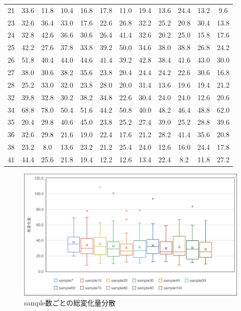 \documentclass{ltjsreport}
\begin{document}
\begin{table}[H]
\begin{center}
\begin{tabular}{c|ccccccccccc}
			21 & 33.6 & 11.8 & 10.4 & 16.8 & 17.8 & 11.0 & 19.4 & 13.6 & 24.4 & 13.2 & 9.6 \\
			23 & 32.6 & 36.4 & 33.0 & 17.6 & 22.6 & 26.8 & 32.2 & 25.2 & 20.8 & 30.4 & 13.8 \\
			24 & 32.8 & 42.6 & 36.6 & 30.6 & 26.4 & 41.4 & 32.6 & 20.2 & 25.0 & 15.8 & 17.6 \\
			25 & 42.2 & 27.6 & 37.8 & 33.8 & 39.2 & 50.0 & 34.6 & 38.0 & 38.8 & 26.8 & 24.2 \\
			26 & 51.8 & 40.4 & 44.0 & 44.6 & 41.4 & 39.2 & 42.8 & 38.4 & 41.6 & 43.0 & 30.0 \\
			27 & 38.0 & 30.6 & 38.2 & 35.6 & 23.8 & 20.4 & 24.4 & 24.2 & 22.6 & 30.6 & 16.8 \\
			28 & 25.2 & 33.0 & 32.0 & 23.8 & 28.0 & 20.0 & 31.4 & 13.6 & 19.6 & 19.4 & 21.2 \\
			32 & 39.8 & 32.8 & 30.2 & 38.2 & 34.8 & 22.6 & 30.4 & 24.0 & 24.0 & 12.6 & 20.6 \\
			34 & 68.8 & 78.0 & 50.4 & 51.6 & 44.2 & 50.8 & 40.0 & 48.2 & 46.4 & 48.8 & 62.0 \\
			35 & 20.4 & 29.8 & 40.6 & 45.0 & 23.8 & 25.2 & 27.4 & 39.0 & 25.2 & 28.8 & 39.6 \\
			36 & 32.6 & 29.8 & 21.6 & 19.0 & 22.4 & 17.6 & 21.2 & 28.2 & 41.4 & 35.6 & 20.8 \\
			38 & 23.2 & 8.0 & 13.6 & 23.2 & 21.2 & 25.4 & 24.0 & 12.6 & 16.0 & 24.4 & 17.8 \\
			41 & 44.4 & 25.6 & 21.8 & 19.4 & 12.2 & 12.6 & 13.4 & 22.4 & 8.2 & 11.8 & 27.2 \\
			\bottomrule
		\end{tabular}
		\end{center}
		\end{table}

		\begin{figure}[H]
		\centering
		\includegraphics[width = 14cm]{../figs/FVRALL.png}
		\caption{sample数ごとの総変化量分散}
		\label{fig:FVRdata}
		\end{figure}
\end{document}

